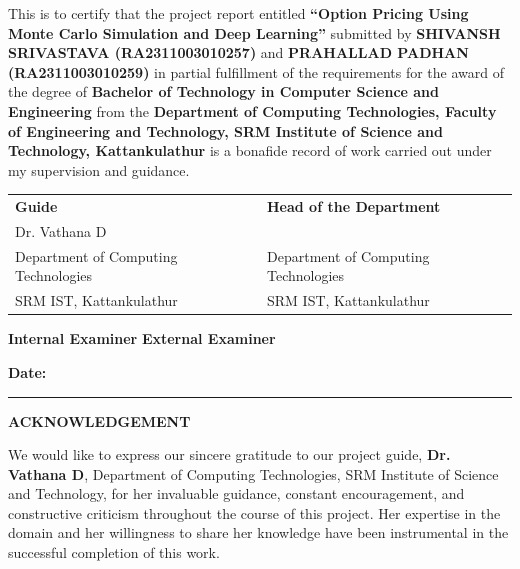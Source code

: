 \documentclass[12pt,a4paper]{report}
\begin{document}
\vspace{1cm}

This is to certify that the project report entitled \textbf{``Option Pricing Using Monte Carlo Simulation and Deep Learning''} submitted by \textbf{SHIVANSH SRIVASTAVA (RA2311003010257)} and \textbf{PRAHALLAD PADHAN (RA2311003010259)} in partial fulfillment of the requirements for the award of the degree of \textbf{Bachelor of Technology in Computer Science and Engineering} from the \textbf{Department of Computing Technologies, Faculty of Engineering and Technology, SRM Institute of Science and Technology, Kattankulathur} is a bonafide record of work carried out under my supervision and guidance.

\vspace{3cm}

\noindent
\begin{tabular}{p{7cm}p{7cm}}
\textbf{Guide} & \textbf{Head of the Department} \\[1.5cm]
Dr. Vathana D & \\
Department of Computing Technologies & Department of Computing Technologies \\
SRM IST, Kattankulathur & SRM IST, Kattankulathur \\
\end{tabular}

\vspace{3cm}

\noindent
\textbf{Internal Examiner} \hspace{4cm} \textbf{External Examiner}

\vspace{1.5cm}

\noindent
\textbf{Date:} \rule{4cm}{0.4pt}

\newpage
\thispagestyle{empty}
\begin{center}
\textbf{\Large ACKNOWLEDGEMENT}
\end{center}

\vspace{1cm}

We would like to express our sincere gratitude to our project guide, \textbf{Dr. Vathana D}, Department of Computing Technologies, SRM Institute of Science and Technology, for her invaluable guidance, constant encouragement, and constructive criticism throughout the course of this project. Her expertise in the domain and her willingness to share her knowledge have been instrumental in the successful completion of this work.
\end{document}
